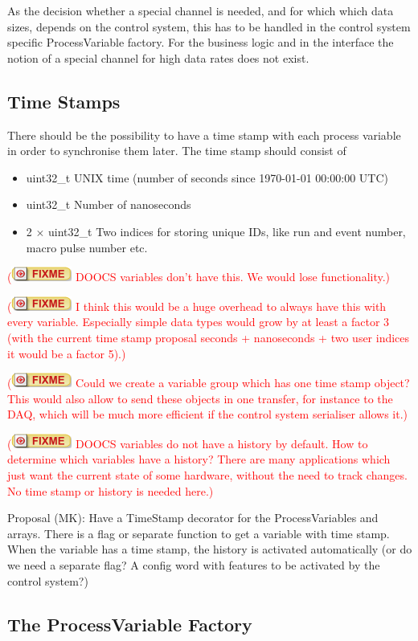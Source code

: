 \documentclass[11pt,a4paper]{scrartcl}
\newcounter{nFixmes}
\newcommand{\fixme}[1]{\addtocounter{nFixmes}{1}\textcolor{red}{(\includegraphics[height=2ex]{fixme} #1)}\xspace}
\begin{document}
As the decision whether a special channel is needed, and for which which data sizes, depends on
the control system, this has to be handled in the control system specific
ProcessVariable factory. For the business logic and in the interface the
notion of a special channel for high data rates does not exist.

\subsection{Time Stamps}
There should be the possibility to have a time stamp with each process variable in order to
synchronise them later. The time stamp should consist of
\begin{itemize}
  \item uint32\_t UNIX time (number of seconds since 1970-01-01 00:00:00 UTC)
  \item uint32\_t Number of nanoseconds
  \item 2 $\times$ uint32\_t Two indices for storing unique IDs, like run and event number, macro pulse number etc.
\end{itemize}
\fixme{DOOCS variables don't have this. We would lose functionality.}

\fixme{I think this would be a huge overhead to always have this with every variable. Especially
  simple data types would grow by at least a factor 3 (with the current time stamp proposal
 seconds + nanoseconds + two user indices it would be a factor 5).}

\fixme{Could we create a variable group which has one time stamp object? This would also
  allow to send these objects in one transfer, for instance to the DAQ, which will be much more
  efficient if the control system serialiser allows it.}

\fixme{DOOCS variables do not have a history by default. How to determine which variables 
  have a history? There are many applications which just want the current state of some
  hardware, without the need to track changes. No time stamp or history is needed here.}

Proposal (MK): Have a TimeStamp decorator for the ProcessVariables and arrays. There is a flag or
separate function to get a variable with time stamp. When the variable has a time stamp,
the history is activated automatically (or do we need a separate flag? A config word with 
features to be activated by the control system?)

\subsection{The ProcessVariable Factory}
\end{document}

